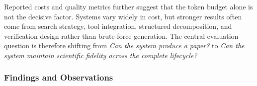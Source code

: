 Reported costs and quality metrics further suggest that the token budget alone is not the decisive factor. Systems vary widely in cost, but stronger results often come from search strategy, tool integration, structured decomposition, and verification design rather than brute-force generation. The central evaluation question is therefore shifting from \emph{Can the system produce a paper?} to \emph{Can the system maintain scientific fidelity across the complete lifecycle?}



% 



\subsubsection{Findings and Observations}
\label{sec:e2e_findings}

